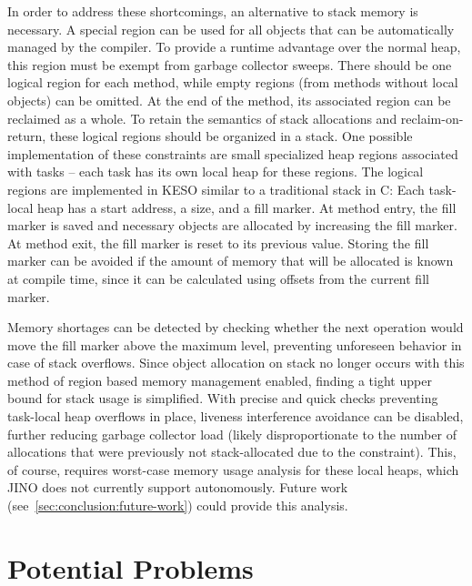 			In order to address these shortcomings, an alternative to stack memory is necessary. A special region can be used
			for all objects that can be automatically managed by the compiler. To provide a runtime advantage over the normal
			heap, this region must be exempt from garbage collector sweeps. There should be one logical region for each
			method, while empty regions (from methods without local objects) can be omitted. At the end of the method, its
			associated region can be reclaimed as a whole. To retain the semantics of stack allocations and reclaim-on-return,
			these logical regions should be organized in a stack. One possible implementation of these constraints are small
			specialized heap regions associated with tasks – each task has its own local heap for these regions. The logical
			regions are implemented in KESO similar to a traditional stack in C: Each task-local heap has a start address,
			a size, and a fill marker. At method entry, the fill marker is saved and necessary objects are allocated by
			increasing the fill marker. At method exit, the fill marker is reset to its previous value. Storing the fill
			marker can be avoided if the amount of memory that will be allocated is known at compile time, since it can be
			calculated using offsets from the current fill marker.

			Memory shortages can be detected by checking whether the next operation would move the fill marker above the
			maximum level, preventing unforeseen behavior in case of stack overflows. Since object allocation on stack no
			longer occurs with this method of region based memory management enabled, finding a tight upper bound for stack
			usage is simplified. With precise and quick checks preventing task-local heap overflows in place, liveness
			interference avoidance can be disabled, further reducing garbage collector load (likely disproportionate to the
			number of allocations that were previously not stack-allocated due to the constraint). This, of course, requires
			worst-case memory usage analysis for these local heaps, which JINO does not currently support autonomously. Future
			work (see~\cref{sec:conclusion:future-work}) could provide this analysis.

	\section{Potential Problems}
		\label{sec:eea:probs}
